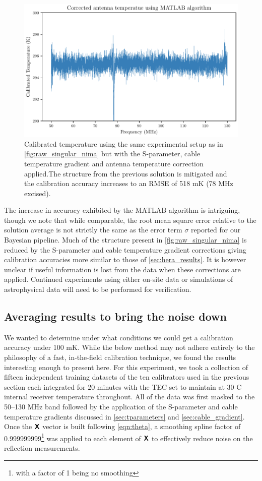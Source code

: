 \begin{figure}
    \centering
    \includegraphics[width=.8\textwidth]{corrected_matlab_solution}
    \caption{Calibrated temperature using the same experimental setup as in \cref{fig:raw_singular_nima} but with the S-parameter, cable temperature gradient and antenna temperature correction applied.The structure from the previous solution is mitigated and the calibration accuracy increases to an RMSE of 518 mK (78 MHz excised).}
    \label{fig:corrected_singular_nima}
\end{figure}

The increase in accuracy exhibited by the MATLAB algorithm is intriguing, though we note that while comparable, the root mean square error relative to the solution average is not strictly the same as the error term $\sigma$ reported for our Bayesian pipeline. Much of the structure present in \cref{fig:raw_singular_nima} is reduced by the S-parameter and cable temperature gradient corrections giving calibration accuracies more similar to those of \cref{sec:hera_results}. It is however unclear if useful information is lost from the data when these corrections are applied. Continued experiments using either on-site data or simulations of astrophysical data will need to be performed for verification.

\subsection{Averaging results to bring the noise down}\label{sec:matlab_avg_results}
We wanted to determine under what conditions we could get a calibration accuracy under 100 mK. While the below method may not adhere entirely to the philosophy of a fast, in-the-field calibration technique, we found the results interesting enough to present here. For this experiment, we took a collection of fifteen independent training datasets of the ten calibrators used in the previous section each integrated for 20 minutes with the TEC set to maintain at 30 \textdegree C internal receiver temperature throughout. All of the data was first masked to the 50--130 MHz band followed by the application of the S-parameter and cable temperature gradients discussed in \cref{sec:tparameters} and \cref{sec:cable_gradient}. Once the $\textbf{\textsf{X}}$ vector is built following \cref{eqn:theta}, a smoothing spline factor of 0.999999999\footnote{with a factor of 1 being no smoothing} was applied to each element of $\textbf{\textsf{X}}$ to effectively reduce noise on the reflection measurements.


